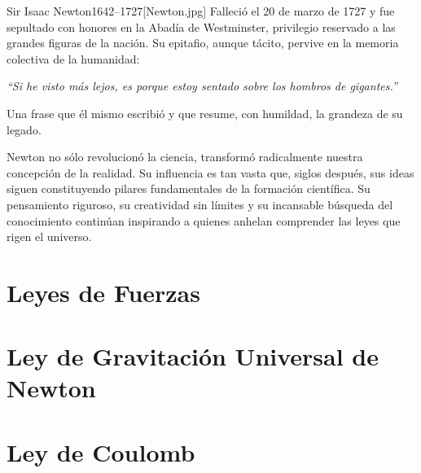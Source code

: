 \begin{semblanza}{Sir Isaac Newton}{1642–1727}[Newton.jpg]
    Falleció el 20 de marzo de 1727 y fue sepultado con honores en la Abadía de Westminster, privilegio reservado a las grandes figuras de la nación. Su epitafio, aunque tácito, pervive en la memoria colectiva de la humanidad:
    \begin{center}
        \textit{“Si he visto más lejos, es porque estoy sentado sobre los hombros de gigantes.”}
    \end{center}
    Una frase que él mismo escribió y que resume, con humildad, la grandeza de su legado.

    Newton no sólo revolucionó la ciencia, transformó radicalmente nuestra concepción de la realidad. Su influencia es tan vasta que, siglos después, sus ideas siguen constituyendo pilares fundamentales de la formación científica. Su pensamiento riguroso, su creatividad sin límites y su incansable búsqueda del conocimiento continúan inspirando a quienes anhelan comprender las leyes que rigen el universo.
\end{semblanza}

\section{Leyes de Fuerzas}

\section[Ley de Gravitación Universal]{Ley de Gravitación Universal de Newton}

\section{Ley de Coulomb}

\cleardoublepage